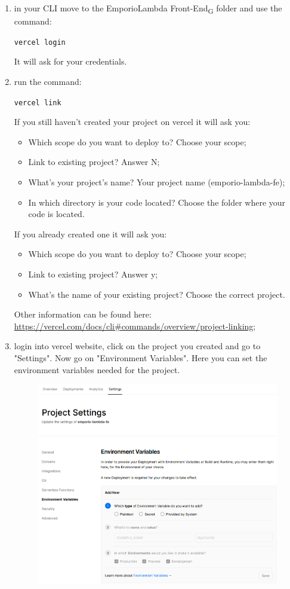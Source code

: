 \begin{enumerate}
\item in your CLI move to the EmporioLambda Front-End\textsubscript{G} folder and use the command:\begin{center}\texttt{vercel login}\end{center}It will ask for your credentials.
\item run the command:\begin{center}\texttt{vercel link}\end{center} If you still haven't created your project on vercel it will ask you:
\begin{itemize}
\item Which scope do you want to deploy to? Choose your scope;
\item Link to existing project? Answer N;
\item What’s your project’s name? Your project name (emporio-lambda-fe);
\item In which directory is your code located? Choose the folder where your code is located.
\end{itemize}
If you already created one it will ask you:
\begin{itemize}
\item Which scope do you want to deploy to? Choose your scope;
\item Link to existing project? Answer y;
\item What’s the name of your existing project? Choose the correct project.
\end{itemize}
Other information can be found here: \url{https://vercel.com/docs/cli\#commands/overview/project-linking};
\item login into vercel website, click on the project you created and go to "Settings". Now go on "Environment Variables". Here you can set the environment variables needed for the project.\\
\begin{figure}[H]
\centering
\includegraphics[scale=0.55]{res/Setup/Configurazione/img/settingsEnvVar}\\

\end{figure}
\end{enumerate}
